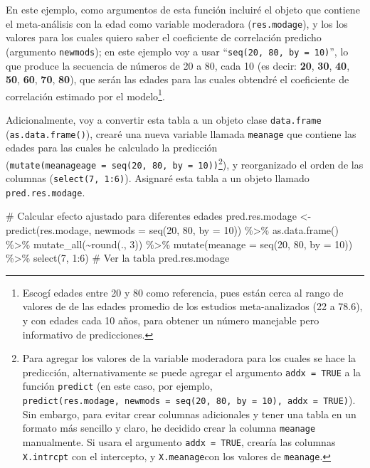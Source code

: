 \documentclass[
  bookmarksnumbered]{article}
\newenvironment{Shaded}{\begin{snugshade}}{\end{snugshade}}
\newcommand{\AttributeTok}[1]{\textcolor[rgb]{0.00,0.34,0.68}{#1}}
\newcommand{\CommentTok}[1]{\textcolor[rgb]{0.54,0.53,0.53}{#1}}
\newcommand{\DecValTok}[1]{\textcolor[rgb]{0.69,0.50,0.00}{#1}}
\newcommand{\FunctionTok}[1]{\textcolor[rgb]{0.39,0.29,0.61}{#1}}
\newcommand{\NormalTok}[1]{\textcolor[rgb]{0.12,0.11,0.11}{#1}}
\newcommand{\OtherTok}[1]{\textcolor[rgb]{0.00,0.43,0.16}{#1}}
\newcommand{\SpecialCharTok}[1]{\textcolor[rgb]{0.24,0.68,0.91}{#1}}
\begin{document}
En este ejemplo, como argumentos de esta función incluiré el objeto que contiene el meta-análisis con la edad como variable moderadora (\texttt{res.modage}), y los los valores para los cuales quiero saber el coeficiente de correlación predicho (argumento \texttt{newmods}); en este ejemplo voy a usar ``\texttt{seq(20,\ 80,\ by\ =\ 10)}'', lo que produce la secuencia de números de 20 a 80, cada 10 (es decir: \textbf{20}, \textbf{30}, \textbf{40}, \textbf{50}, \textbf{60}, \textbf{70}, \textbf{80}), que serán las edades para las cuales obtendré el coeficiente de correlación estimado por el modelo\footnote{Escogí edades entre 20 y 80 como referencia, pues están cerca al rango de valores de de las edades promedio de los estudios meta-analizados (22 a 78.6), y con edades cada 10 años, para obtener un número manejable pero informativo de predicciones.}.

Adicionalmente, voy a convertir esta tabla a un objeto clase \texttt{data.frame} (\texttt{as.data.frame()}), crearé una nueva variable llamada \texttt{meanage} que contiene las edades para las cuales he calculado la predicción (\texttt{mutate(meanageage\ =\ seq(20,\ 80,\ by\ =\ 10))}\footnote{Para agregar los valores de la variable moderadora para los cuales se hace la predicción, alternativamente se puede agregar el argumento \texttt{addx\ =\ TRUE} a la función \texttt{predict} (en este caso, por ejemplo, \texttt{predict(res.modage,\ newmods\ =\ seq(20,\ 80,\ by\ =\ 10),\ addx\ =\ TRUE)}). Sin embargo, para evitar crear columnas adicionales y tener una tabla en un formato más sencillo y claro, he decidido crear la columna \texttt{meanage} manualmente. Si usara el argumento \texttt{addx\ =\ TRUE}, crearía las columnas \texttt{X.intrcpt} con el intercepto, y \texttt{X.meanage}con los valores de \texttt{meanage}.}), y reorganizado el orden de las columnas (\texttt{select(7,\ 1:6)}). Asignaré esta tabla a un objeto llamado \texttt{pred.res.modage}.

\begin{Shaded}
\begin{Highlighting}[]
\CommentTok{\# Calcular efecto ajustado para diferentes edades}
\NormalTok{pred.res.modage }\OtherTok{\textless{}{-}} \FunctionTok{predict}\NormalTok{(res.modage, }\AttributeTok{newmods =} \FunctionTok{seq}\NormalTok{(}\DecValTok{20}\NormalTok{, }\DecValTok{80}\NormalTok{, }\AttributeTok{by =} \DecValTok{10}\NormalTok{)) }\SpecialCharTok{\%\textgreater{}\%} 
  \FunctionTok{as.data.frame}\NormalTok{() }\SpecialCharTok{\%\textgreater{}\%} 
  \FunctionTok{mutate\_all}\NormalTok{(}\SpecialCharTok{\textasciitilde{}}\FunctionTok{round}\NormalTok{(., }\DecValTok{3}\NormalTok{)) }\SpecialCharTok{\%\textgreater{}\%} 
  \FunctionTok{mutate}\NormalTok{(}\AttributeTok{meanage =} \FunctionTok{seq}\NormalTok{(}\DecValTok{20}\NormalTok{, }\DecValTok{80}\NormalTok{, }\AttributeTok{by =} \DecValTok{10}\NormalTok{)) }\SpecialCharTok{\%\textgreater{}\%} 
  \FunctionTok{select}\NormalTok{(}\DecValTok{7}\NormalTok{, }\DecValTok{1}\SpecialCharTok{:}\DecValTok{6}\NormalTok{)}
\CommentTok{\# Ver la tabla}
\NormalTok{pred.res.modage}
\end{Highlighting}
\end{Shaded}
\end{document}
